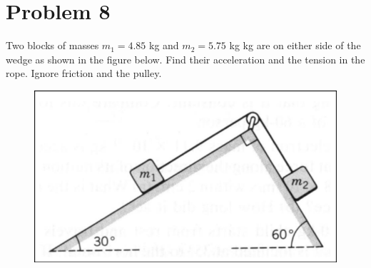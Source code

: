 \documentclass{article}
\begin{document}
\section*{Problem 8}
Two blocks of masses $m_1 = 4.85$ kg and $m_2 = 5.75$ kg kg are on either side of the wedge as shown in
the figure below. Find their acceleration and the tension in the rope. Ignore friction and the pulley.
\begin{figure}[ht]
    \centering
    \includegraphics[scale=.4]{drawing-6.png}
\end{figure}
\end{document}
